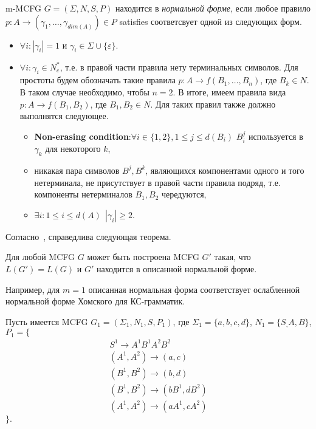 \begin{definition} m-MCFG $G = (\Sigma, N, S, P)$ находится в \emph{нормальной форме}, если любое правило $p: A \rightarrow (\gamma_1, \dots, \gamma_{dim(A)}) \in P$ satisfies соответсвует одной из следующих форм.
	\begin{itemize}
		\item $\forall i: |\gamma_i| = 1$ и $\gamma_i \in \Sigma \cup \{\varepsilon\}$.
		\item $\forall i: \gamma_i \in N_c^*$, т.е. в правой части правила нету терминальных символов. Для простоты будем обозначать такие правила $p: A \rightarrow f(B_1, \dots, B_n)$, где $B_k \in N$. В таком случае необходимо, чтобы $n = 2$. В итоге, имеем правила вида $p: A \rightarrow f(B_1, B_2)$, где $B_1, B_2 \in N$. Для таких правил также должно выполнятся следующее.
		\begin{itemize}
			\item \textbf{Non-erasing condition}:$\forall i \in \{1,2\}, 1 \leq j \leq d(B_i)$ $B_i^j$ используется в $\gamma_k$ для некоторого $k$,
			\item никакая пара символов $B^j, B^k$, являющихся компонентами одного и того нетерминала, не присутствует в правой части правила подряд, т.е. компоненты нетерминалов $B_1, B_2$ чередуются,
			\item $\exists i: 1 \leq i \leq d(A) \ \ |\gamma_i| \geq 2$.
		\end{itemize}
	\end{itemize}
\end{definition}

Согласно~\cite{nakanishi1997efficient}, справедлива следующая теорема.

\begin{theorem}\label{thm:formofmcfg}
	Для любой MCFG $G$ может быть построена MCFG $G'$ такая, что $L(G') = L(G)$ и $G'$ находится в описанной нормальной форме.
\end{theorem}

Например, для $m = 1$ описанная нормальная форма соответствует ослабленной нормальной форме Хомского для КС-грамматик.

Пусть имеется MCFG $G_1 = (\Sigma_1, N_1, S, P_1)$, где $\Sigma_1 = \{a,b,c,d\}$, $N_1 = \{S_, A, B\}$, $P_1 = \{$
\begin{align*}
	S^1 \rightarrow A^1 B^1 A^2 B^2 \\
	(A^1, A^2) \rightarrow (a,c) \\
	(B^1, B^2) \rightarrow (b,d) \\
	(B^1, B^2) \rightarrow (bB^1, dB^2) \\
	(A^1, A^2) \rightarrow (aA^1, cA^2)
\end{align*}
$\}.$

